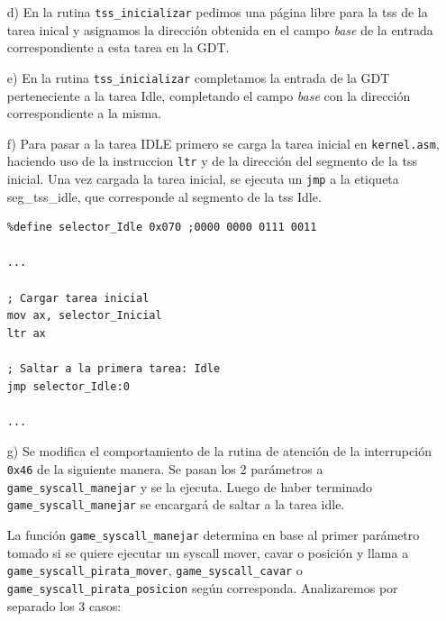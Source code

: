 \begin{enumerate}
\item[d)] En la rutina {\tt tss\_inicializar} pedimos una página libre para la tss de la tarea inical y asignamos la dirección obtenida en el campo {\it base} de la entrada correspondiente a esta tarea en la GDT.

\item[e)] En la rutina {\tt tss\_inicializar} completamos la entrada de la GDT perteneciente a la tarea Idle, completando el campo {\it base} con la dirección correspondiente a la misma.

\item[f)]Para pasar a la tarea IDLE primero se carga la tarea inicial en {\tt kernel.asm}, haciendo uso de la instruccion {\tt ltr} y de la dirección del segmento de la tss inicial. Una vez cargada la tarea inicial, se ejecuta un {\tt jmp} a la etiqueta seg_tss_idle, que corresponde al segmento de la tss Idle.

\begin{lstlisting}[frame=single]
%define selector_Inicial 0x0068 ;0000000001101011
%define selector_Idle 0x070 ;0000 0000 0111 0011

...

; Cargar tarea inicial
mov ax, selector_Inicial
ltr ax

; Saltar a la primera tarea: Idle
jmp selector_Idle:0

...
\end{lstlisting}

\item[g)]Se modifica el comportamiento de la rutina de atención de la interrupción {\tt 0x46} de la siguiente manera. Se pasan los 2 parámetros a {\tt game\_syscall\_manejar} y se la ejecuta. Luego de haber terminado {\tt game\_syscall\_manejar} se encargará de saltar a la tarea idle. 

La función {\tt game\_syscall\_manejar} determina en base al primer parámetro tomado si se quiere ejecutar un syscall mover, cavar o posición y llama a {\tt game\_syscall\_pirata\_mover}, {\tt game\_syscall\_cavar} o {\tt game\_syscall\_pirata\_posicion} según corresponda. Analizaremos por separado los 3 casos:



\end{enumerate}
